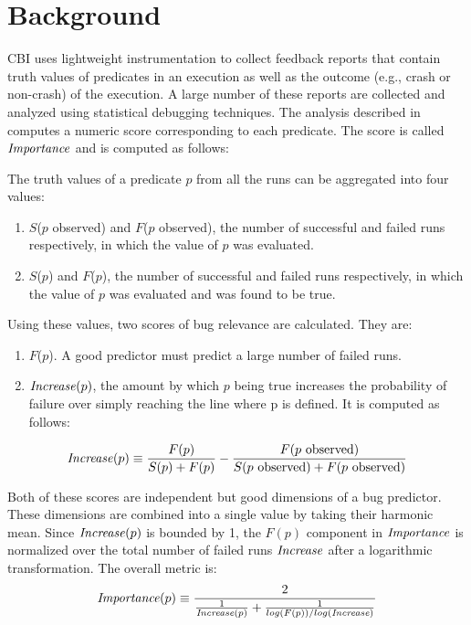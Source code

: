 
\section{Background}
\label{sec-bground}
CBI uses lightweight instrumentation to collect feedback reports that contain truth values of predicates in an execution as well as the outcome (e.g., crash or non-crash) of the execution.  A large number of these reports are collected and analyzed using statistical debugging techniques.  The analysis described in~\cite{Liblit:2005:SSBI} computes a numeric score corresponding to each predicate.  The score is called $\mathit{Importance}$ and is computed as follows:

The truth values of a predicate $p$ from all the runs can be aggregated into four values:

\begin{enumerate}
\item $S$($p$ observed) and $F$($p$ observed), the number of successful and failed runs respectively, in which the value of $p$ was evaluated.
\item $S$($p$) and $F$($p$), the number of successful and failed runs respectively, in which the value of $p$ was evaluated and was found to be true.
\end{enumerate}

Using these values, two scores of bug relevance are calculated.  They are:
\begin{enumerate}
\item $F$($p$).  A good predictor must predict a large number of failed runs.
\item $\mathit{Increase}(p)$, the amount by which $p$ being true increases the probability of failure over simply reaching the line where p is defined.  It is computed as follows:
\end{enumerate}

\begin{equation}
\label{eqn1}
\mathit{Increase}(p) \equiv
\frac{F(p)}{S(p) + F(p)}
-
\frac{F(\text{$p$ observed})}{S(\text{$p$ observed}) +
  F(\text{$p$ observed})}
\end{equation}

Both of these scores are independent but good dimensions of a bug predictor.  These dimensions are combined into a single value by taking their harmonic mean.  Since $\mathit{Increase}(p)$ is bounded by 1, the $F(p)$ component in $\mathit{Importance}$ is normalized over the total number of failed runs $\mathit{Increase}$ after a logarithmic transformation.  The overall metric is:
\begin{equation}
\label{eqn2}
\mathit{Importance}(p) \equiv
\frac{2}{
  \frac{1}{\mathit{Increase}(p)}
  +
  \frac{1}{log(F(p)) / log(\mathit{Increase})}}
\end{equation}

